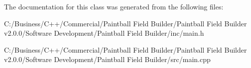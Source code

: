 The documentation for this class was generated from the following files:\begin{DoxyCompactItemize}
\item 
C:/Business/C++/Commercial/Paintball Field Builder/Paintball Field Builder v2.0.0/Software Development/Paintball Field Builder/inc/main.h\item 
C:/Business/C++/Commercial/Paintball Field Builder/Paintball Field Builder v2.0.0/Software Development/Paintball Field Builder/src/main.cpp\end{DoxyCompactItemize}

